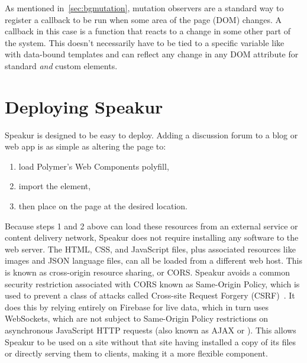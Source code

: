 As mentioned in~\cref{sec:bgmutation}, 
mutation observers are a standard way to register a callback to be run when some area of the page (DOM) changes. 
A callback in this case is a function that reacts to a change in some other part of the system.
This doesn't necessarily have to be tied to a specific variable like with data-bound templates and can reflect any change in any DOM attribute for standard \textit{and} custom elements. 

\section{Deploying Speakur}
\label{sec:deploying}
Speakur is designed to be easy to deploy.
Adding a discussion forum to a blog or web app is as simple as altering the page to:

\begin{enumerate}
\item load Polymer's Web Components polyfill,
\item import the  element,
\item then place  on the page at the desired location. 
\end{enumerate}

Because steps 1 and 2 above can load these resources from an external service or content delivery network,
Speakur does not require installing any software to the web server.
The HTML, CSS, and JavaScript files, plus associated resources like images and JSON language files, 
can all be loaded from a different web host. 
This is known as cross-origin resource sharing, or CORS.
Speakur avoids a common security restriction associated with CORS known as Same-Origin Policy, which is used to prevent a class of attacks called Cross-site Request Forgery (CSRF)~\cite{mozillacontributors2015-b}.
It does this by relying entirely on Firebase for live data,
which in turn uses WebSockets,
which are not subject to Same-Origin Policy restrictions on asynchronous JavaScript HTTP requests (also known as AJAX or ).
This allows Speakur to be used on a site without that site having installed a copy of its files or directly serving them to clients, 
making it a more flexible component.

